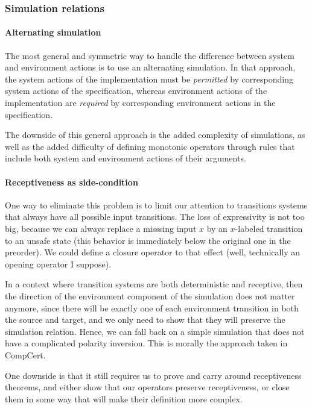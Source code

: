 \documentclass[11pt]{article}
\begin{document}

\subsubsection{Simulation relations} %

\paragraph{Alternating simulation}

The most general and symmetric way to
handle the difference between system and environment actions
is to use an alternating simulation.
In that approach,
the system actions of the implementation must be \emph{permitted}
by corresponding system actions of the specification,
whereas environment actions of the implementation are \emph{required}
by corresponding environment actions in the specification.

The downside of this general approach is
the added complexity of simulations,
as well as the added difficulty of defining
monotonic operators
through rules that include
both system and environment actions
of their arguments.

\paragraph{Receptiveness as side-condition}

One way to eliminate this problem is to limit our attention to
transitions systems that always have all possible input transitions.
The loss of expressivity is not too big,
because we can always replace a misssing input $x$
by an $x$-labeled transition to an unsafe state
(this behavior is immediately below the original one in the preorder).
We could define a closure operator to that effect
(well, technically an opening operator I suppose).

In a context where transition systems are
both deterministic and receptive,
then the direction of the environment component of the simulation
does not matter anymore,
since there will be exactly one of each environment transition
in both the source and target,
and we only need to show that they will preserve
the simulation relation.
Hence, we can fall back on a simple simulation
that does not have a complicated polarity inversion.
This is morally the approach taken in CompCert.

One downside is that it still requires us to prove and carry around
receptiveness theorems,
and either show that our operators preserve receptiveness,
or close them in some way that will make their definition more complex.
\end{document}
